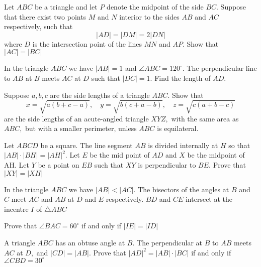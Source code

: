 \documentclass{pset}
\begin{document}
\begin{problems}
\begin{problem}[IrMO 2010 Q2]
    Let \(A B C\) be a triangle and let \(P\) denote the midpoint of the side \(B C .\) Suppose that there exist two points \(M\) and \(N\) interior to the sides \(A B\) and \(A C\) respectively, such that
    $$
    |A D|=|D M|=2|D N|
    $$
    where \(D\) is the intersection point of the lines \(M N\) and \(A P .\) Show that \(|A C|=|B C|\)
\end{problem}


\begin{problem}[IrMO 2010 Q8]
    In the triangle \(A B C\) we have \(|A B|=1\) and \(\angle A B C=120^{\circ} .\) The perpendicular line to \(A B\) at \(B\) meets \(A C\) at \(D\) such that \(|D C|=1 .\) Find the length of \(A D .\)
\end{problem}

\begin{problem}[IrMO 2010 Q10]
    Suppose \(a, b, c\) are the side lengths of a triangle \(A B C .\) Show that
    $$
    x=\sqrt{a(b+c-a)}, \quad y=\sqrt{b(c+a-b)}, \quad z=\sqrt{c(a+b-c)}
    $$
    are the side lengths of an acute-angled triangle \(X Y Z,\) with the same area as \(A B C,\) but with a smaller perimeter, unless \(A B C\) is equilateral.
\end{problem}


\begin{problem}[IrMO 2009 Q2]
    Let \(A B C D\) be a square. The line segment \(A B\) is divided internally at \(H\) so that \(|A B| \cdot|B H|=|A H|^{2} .\) Let \(E\) be the mid point of \(A D\) and \(X\) be the midpoint of AH. Let \(Y\) be a point on \(E B\) such that \(X Y\) is perpendicular to \(B E .\) Prove that \(|X Y|=|X H|\)
\end{problem}

\begin{problem}[IrMO 2009 Q10]
    In the triangle \(A B C\) we have \(|A B|<|A C| .\) The bisectors of the angles at \(B\) and \(C\) meet \(A C\) and \(A B\) at \(D\) and \(E\) respectively. \(B D\) and \(C E\) intersect at the incentre
    \(I\) of \(\triangle A B C\)

    Prove that \(\angle B A C=60^{\circ}\) if and only if \(|I E|=|I D|\)
\end{problem}

\begin{problem}[IrMO 2008 Q5]
    A triangle \(A B C\) has an obtuse angle at \(B .\) The perpendicular at \(B\) to \(A B\) meets \(A C\) at \(D,\) and \(|C D|=|A B| .\) Prove that \(|A D|^{2}=|A B| \cdot|B C|\) if and only if \(\angle C B D=30^{\circ}\)
\end{problem}


\end{problems}
\end{document}

